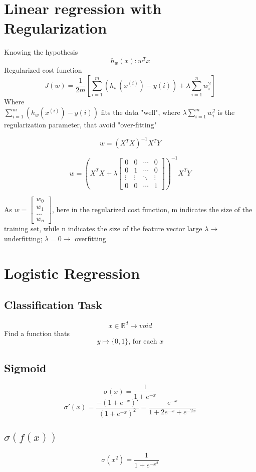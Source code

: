 \documentclass{article}
\begin{document}
\section*{Linear regression with Regularization}
Knowing the hypothesis 
\[h_w(x): w^Tx\]
Regularized cost function
\[J(w) = \frac{1}{2m}\left[\sum_{i = 1}^{m}(h_w(x^{(i)})- y{(i)}) + \lambda\sum_{i=1}^{n} w_i^2\right]\]
Where \\
$\sum_{i = 1}^{m}(h_w(x^{(i)})- y{(i)})$ fits the data "well", where
$ \lambda\sum_{i=1}^{m} w_i^2$ is the regularization parameter, that avoid "over-fitting"

\[w = (X^TX)^{-1}X^TY\]

\[w = (X^TX + \lambda \begin{bmatrix}
    0 & 0 & \cdots & 0 \\
    0 & 1 & \cdots & 0 \\
    \vdots & \vdots & \ddots & \vdots \\
    0 & 0 & \cdots  & 1
\end{bmatrix}) ^{-1} X^TY\]

As \(w = 
\begin{bmatrix}
    w_0 \\w_1 \\\dots \\w_n
\end{bmatrix}\), here in the regularized cost function, m indicates the size of the training set, while n indicates the size of the feature vector
large $\lambda \rightarrow$ underfitting; $\lambda = 0 \rightarrow$ overfitting 

\section{Logistic Regression}
\subsection*{Classification Task}
\[x \in \mathbb{R}^d \mapsto void\]
Find a function thats 
\[y \mapsto \{0, 1\} \text{, for each } x\]
\subsection*{Sigmoid}
\[\sigma(x) = \frac{1}{1 + e^{-x}}\]
\[\sigma'(x) = \frac{-(1 + e^{-x})'}{(1 + e^{-x})^2} = \frac{e^{-x}}{1 + 2e^{-x} + e^{-2x}}\]

\subsection*{$\sigma(f(x))$}
\[\sigma(x^2) = \frac{1}{1 + e^{-x^2}}\]
\end{document}
